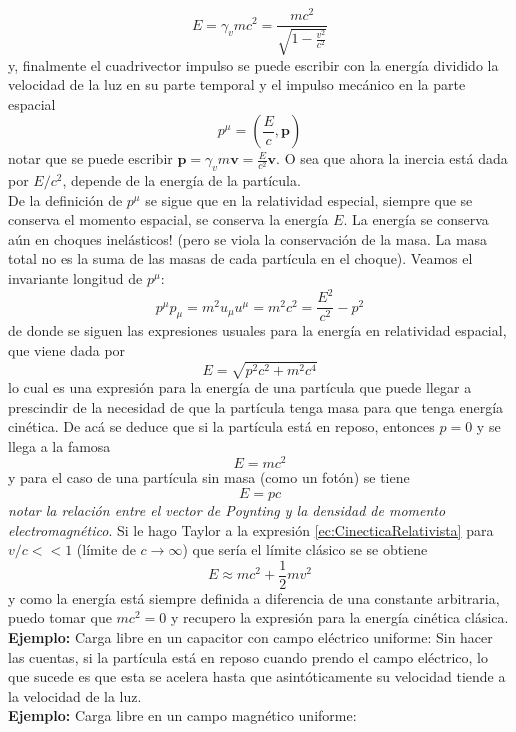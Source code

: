 \begin{equation*}
    E = \gamma_{v}mc^{2} = \frac{mc^{2}}{\sqrt{1 - \frac{v^{2}}{c^{2}}}}
\end{equation*}
y, finalmente el cuadrivector impulso se puede escribir con la energía dividido la velocidad de la luz en su parte temporal y el impulso mecánico en la parte espacial
\begin{equation*}
    p^{\mu} = 
    \left(
        \frac{E}{c}, \textbf{p} 
    \right)
\end{equation*}
notar que se puede escribir $\textbf{p} = \gamma_{v} m \textbf{v} = \frac{E}{c^{2}}\textbf{v}$. O sea que ahora la inercia está dada por $E/c^{2}$, depende de la energía de la partícula.\\
\indent De la definición de $p^{\mu}$ se sigue que en la relatividad especial, siempre que se conserva el momento espacial, se conserva la energía $E$. La energía se conserva aún en choques inelásticos! (pero se viola la conservación de la masa. La masa total no es la suma de las masas de cada partícula en el choque). Veamos el invariante longitud de $p^{\mu}$:
\begin{equation*}
    p^{\mu}p_{\mu} = m^{2}u_{\mu}u^{\mu} = m^{2}c^{2} = \frac{E^{2}}{c^{2}} - p^{2}
\end{equation*}
de donde se siguen las expresiones usuales para la energía en relatividad espacial, que viene dada por
\begin{equation}
    E = \sqrt{p^{2}c^{2} + m^{2}c^{4}}
        \label{ec:CinecticaRelativista}
\end{equation}
lo cual es una expresión para la energía de una partícula que puede llegar a prescindir de la necesidad de que la partícula tenga masa para que tenga energía cinética. De acá se deduce que si la partícula está en reposo, entonces $p = 0$ y se llega a la famosa
\begin{equation*}
    E = mc^{2}
\end{equation*}
y para el caso de una partícula sin masa (como un fotón) se tiene
\begin{equation*}
    E = pc
\end{equation*}
\textit{notar la relación entre el vector de Poynting y la densidad de momento electromagnético}. Si le hago Taylor a la expresión \eqref{ec:CinecticaRelativista} para $v/c << 1$ (límite de $c \to \infty$) que sería el límite clásico se se obtiene 
\begin{equation*}
    E \approx m c^{2} + \frac{1}{2}mv^{2}
\end{equation*}
y como la energía está siempre definida a diferencia de una constante arbitraria, puedo tomar que $mc^{2} = 0$ y recupero la expresión para la energía cinética clásica.\\
\indent \textbf{Ejemplo:} Carga libre en un capacitor con campo eléctrico uniforme: Sin hacer las cuentas, si la partícula está en reposo cuando prendo el campo eléctrico, lo que sucede es que esta se acelera hasta que asintóticamente su velocidad tiende a la velocidad de la luz.\\
\indent \textbf{Ejemplo:} Carga libre en un campo magnético uniforme:



